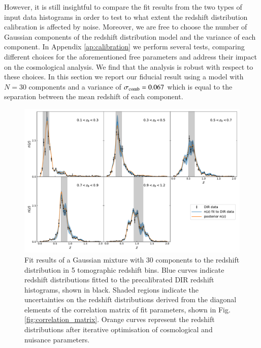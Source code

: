\documentclass{aa}
\begin{document}
However, it is still insightful to compare the fit results from the two types of input data histograms in order to test to what extent the redshift distribution calibration is affected by noise. Moreover, we are free to choose the number of Gaussian components of the redshift distribution model and the variance of each component. In Appendix \ref{ap:calibration} we perform several tests, comparing different choices for the aforementioned free parameters and address their impact on the cosmological analysis. We find that the analysis is robust with respect to these choices. In this section we report our fiducial result using a model with $N = 30$ components and a variance of $\sigma_{\rm comb} = 0.067$ which is equal to the separation between the mean redshift of each component. 
\begin{figure}
\centering
\includegraphics[width=\linewidth]{plots/optimisation_result.pdf}
\caption{Fit results of a Gaussian mixture with 30 components to the redshift distribution in 5 tomographic redshift bins. Blue curves indicate redshift distributions fitted to the precalibrated DIR redshift histograms, shown in black. Shaded regions indicate the uncertainties on the redshift distributions derived from the diagonal elements of the correlation matrix of fit parameters, shown in Fig. \ref{fig:correlation_matrix}. Orange curves represent the redshift distributions after iterative optimisation of cosmological and nuisance parameters.}
\label{fig:comb}
\end{figure}
\end{document}
